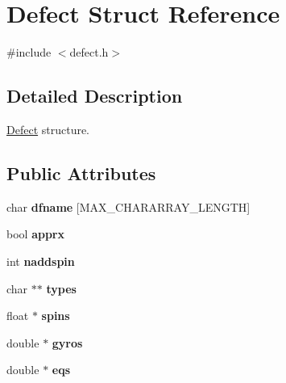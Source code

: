 \hypertarget{structDefect}{\section{Defect Struct Reference}
\label{structDefect}
}


{\ttfamily \#include $<$defect.\-h$>$}



\subsection{Detailed Description}
\hyperlink{structDefect}{Defect} structure. \subsection*{Public Attributes}
\begin{DoxyCompactItemize}
\item 
\hypertarget{structDefect_a146e7e006db29d11dc4ebfffe07f7ba2}{char {\bfseries dfname} \mbox{[}M\-A\-X\-\_\-\-C\-H\-A\-R\-A\-R\-R\-A\-Y\-\_\-\-L\-E\-N\-G\-T\-H\mbox{]}}\label{structDefect_a146e7e006db29d11dc4ebfffe07f7ba2}

\item 
\hypertarget{structDefect_a9a7a7ae97aef4114f4801163ae39147c}{bool {\bfseries apprx}}\label{structDefect_a9a7a7ae97aef4114f4801163ae39147c}

\item 
\hypertarget{structDefect_a7864b15a37c1fb117e560035b63b9c3d}{int {\bfseries naddspin}}\label{structDefect_a7864b15a37c1fb117e560035b63b9c3d}

\item 
\hypertarget{structDefect_aaa82ab61e61e3d31a1761e65236ead88}{char $\ast$$\ast$ {\bfseries types}}\label{structDefect_aaa82ab61e61e3d31a1761e65236ead88}

\item 
\hypertarget{structDefect_a4b7e765b16ce28c69342dd09c35be858}{float $\ast$ {\bfseries spins}}\label{structDefect_a4b7e765b16ce28c69342dd09c35be858}

\item 
\hypertarget{structDefect_adab228a8a6560c6b298ea29f18bcfd95}{double $\ast$ {\bfseries gyros}}\label{structDefect_adab228a8a6560c6b298ea29f18bcfd95}

\item 
\hypertarget{structDefect_a888a4c262ee2351e069ff2188e3d470f}{double $\ast$ {\bfseries eqs}}\label{structDefect_a888a4c262ee2351e069ff2188e3d470f}


\end{DoxyCompactItemize}
